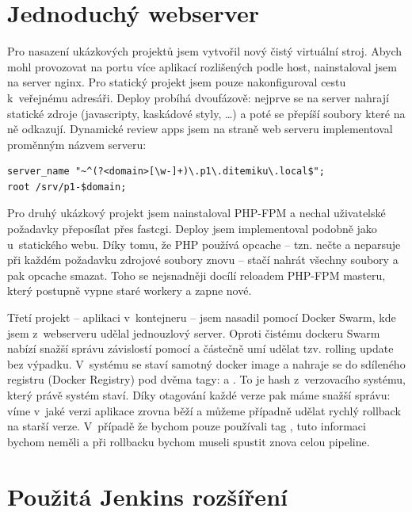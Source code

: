\section{Jednoduchý webserver}
    Pro nasazení ukázkových projektů jsem vytvořil nový čistý virtuální stroj. Abych mohl provozovat na \HTTP portu více aplikací rozlišených podle host, nainstaloval jsem na server nginx. Pro statický projekt jsem pouze nakonfiguroval cestu k~veřejnému adresáři. Deploy probíhá dvoufázově: nejprve se na server nahrají statické zdroje (javascripty, kaskádové styly, \ldots) a poté se přepíší  soubory které na ně odkazují. Dynamické review apps jsem na straně web serveru implementoval proměnným názvem serveru:

        \begin{verbatim}
server_name "~^(?<domain>[\w-]+)\.p1\.ditemiku\.local$";
root /srv/p1-$domain;
        \end{verbatim}

    Pro druhý ukázkový projekt jsem nainstaloval PHP-FPM a nechal uživatelské požadavky přeposílat přes fastcgi. Deploy jsem implementoval podobně jako u~statického webu. Díky tomu, že PHP používá opcache -- tzn. nečte a neparsuje při každém požadavku zdrojové soubory znovu -- stačí nahrát všechny soubory a pak opcache smazat. Toho se nejsnadněji docílí reloadem PHP-FPM masteru, který postupně vypne staré workery a zapne nové.

    Třetí projekt -- aplikaci v~kontejneru -- jsem nasadil pomocí Docker Swarm, kde jsem z~webserveru udělal jednouzlový server. Oproti čistému dockeru Swarm nabízí snažší správu závislostí pomocí  a částečně umí udělat tzv. rolling update bez výpadku. V~\CI systému se staví samotný docker image a nahraje se do sdíleného registru (Docker Registry) pod dvěma tagy:  a . To je hash z~verzovacího systému, který právě \CI systém staví. Díky otagování každé verze pak máme snažší správu: víme v~jaké verzi aplikace zrovna běží a můžeme případně udělat rychlý rollback na starší verze. V~případě že bychom pouze používali tag , tuto informaci bychom neměli a při rollbacku bychom museli spustit znova celou \CI pipeline.

\newpage
\section{Použitá Jenkins rozšíření}
\label{ch:jenkins-plugins}

